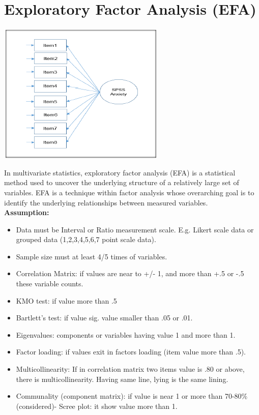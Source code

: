 \documentclass[
  letterpaper,
  DIV=11,
  numbers=noendperiod]{scrreprt}
\providecommand{\tightlist}{%
  \setlength{\itemsep}{0pt}\setlength{\parskip}{0pt}}\usepackage{longtable,booktabs,array}
\begin{document}

\chapter{Exploratory Factor Analysis
(EFA)}\label{exploratory-factor-analysis-efa}

\includegraphics{images/efa.png}

In multivariate statistics, exploratory factor analysis (EFA) is a
statistical method used to uncover the underlying structure of a
relatively large set of variables. EFA is a technique within factor
analysis whose overarching goal is to identify the underlying
relationships between measured variables.\\

{\textbf{Assumption:}}\\

\begin{itemize}
\tightlist
\item
  Data must be Interval or Ratio measurement scale. E.g. Likert scale
  data or grouped data (1,2,3,4,5,6,7 point scale data).\\
\item
  Sample size must at least 4/5 times of variables.\\
\item
  Correlation Matrix: if values are near to +/- 1, and more than +.5 or
  -.5 these variable counts.\\
\item
  KMO test: if value more than .5\\
\item
  Bartlett's test: if value sig. value smaller than .05 or .01.\\
\item
  Eigenvalues: components or variables having value 1 and more than 1.\\
\item
  Factor loading: if values exit in factors loading (item value more
  than .5).\\
\item
  Multicollinearity: If in correlation matrix two items value is .80 or
  above, there is multicollinearity. Having same line, lying is the same
  lining.\\
\item
  Communality (component matrix): if value is near 1 or more than
  70-80\% (considered)- Scree plot: it show value more than 1.\\
\end{itemize}
\end{document}
